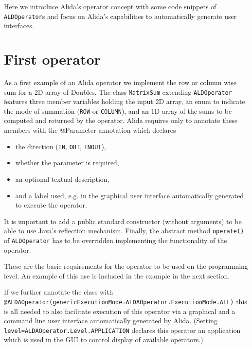 Here we introduce Alida's operator concept with some code snippets of \lstinline+ALDOperator+s
and focus on Alida's capabilities to automatically generate user interfaces.

\section{First operator}

As a first example of an Alida operator we implement the row or column wise
sum for a 2D array of Doubles.
The class \lstinline+MatrixSum+ extending \lstinline+ALDOperator+ features three member variables
holding the input 2D array, an enum to indicate the mode of summation (\lstinline+ROW+ or \lstinline+COLUMN+), and
an 1D array of the sums to be computed and returned by the operator.
Alida requires only to annotate these members with the @Parameter annotation
which declares 
\begin{itemize}
	\item the direction (\lstinline+IN+, \lstinline+OUT+, \lstinline+INOUT+), 
	\item whether the parameter is required,
	\item an optional textual description,
	\item and a label used, e.g. in the graphical user interface automatically generated
		to execute the operator.
\end{itemize}
It is important to add a public standard constructor (without arguments)
to be able to use Java's reflection mechanism.
Finally, the abstract method \lstinline+operate()+ of \lstinline+ALDOperator+ has to be overridden
implementing the functionality of the operator.

\renewcommand{\codefile}{../../../../../../src/de/unihalle/informatik/Alida/demo/MatrixSum.java}
\addtocounter{off}{46}


These are the basic requirements for the operator to be used on the programming level.
An example of this use is included in the example in the next section.

If we further annotate the class with \lstinline+@ALDAOperator(genericExecutionMode=ALDAOperator.ExecutionMode.ALL)+
this is all needed to also facilitate 
execution of this operator via a graphical and a command line user interface
automatically generated by Alida.
(Setting \lstinline+level=ALDAOperator.Level.APPLICATION+ declares this operator an application
which is used in the GUI to control display of available operators.)


